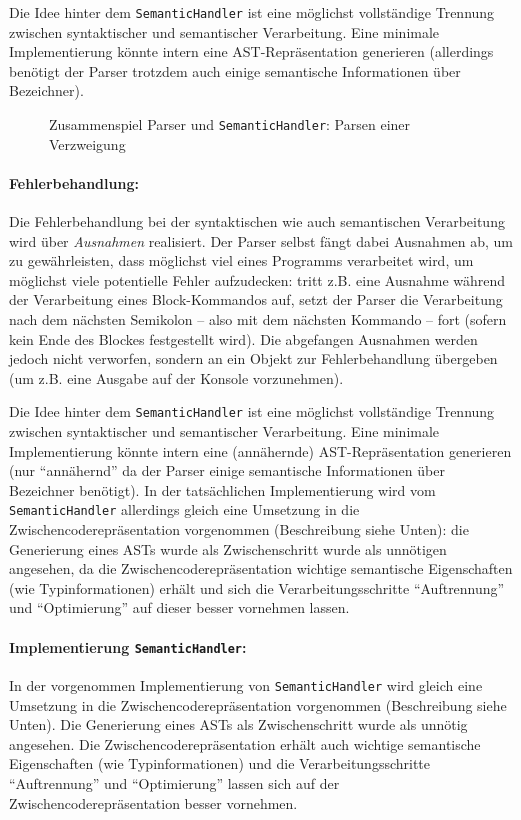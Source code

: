\documentclass[twoside,a4paper,fleqn,12pt]{article}
\begin{document}
Die Idee hinter dem \verb+SemanticHandler+ ist eine möglichst vollständige Trennung zwischen syntaktischer
und semantischer Verarbeitung. Eine minimale Implementierung könnte intern eine
AST-Repräsentation generieren (allerdings benötigt der Parser trotzdem auch einige semantische Informationen über
Bezeichner).

\begin{figure}[h]
   \centering
  
  \caption{Zusammenspiel Parser und \texttt{SemanticHandler}: Parsen einer Verzweigung}
  \label{fig:ParseIf}
\end{figure}

\paragraph{Fehlerbehandlung:}
Die Fehlerbehandlung bei der syntaktischen wie auch semantischen Verarbeitung wird über \emph{Ausnahmen}
realisiert. Der Parser selbst fängt dabei Ausnahmen ab, um zu gewährleisten, dass möglichst viel eines
Programms verarbeitet wird, um möglichst viele potentielle Fehler aufzudecken: %
tritt z.B. eine Ausnahme während der Verarbeitung eines Block-Kommandos auf, setzt der Parser die
Verarbeitung nach dem nächsten Semikolon -- also mit dem nächsten Kommando -- fort (sofern kein Ende
des Blockes festgestellt wird).
Die abgefangen Ausnahmen werden jedoch nicht verworfen, sondern an ein Objekt zur Fehlerbehandlung
übergeben (um z.B. eine Ausgabe auf der Konsole vorzunehmen).

Die Idee hinter dem \verb+SemanticHandler+ ist eine möglichst vollständige Trennung zwischen syntaktischer
und semantischer Verarbeitung. Eine minimale Implementierung könnte intern eine (annähernde)
AST-Repräsentation generieren (nur "`annähernd"' da der Parser einige semantische Informationen über
Bezeichner benötigt). In der tatsächlichen Implementierung wird vom \verb+SemanticHandler+ allerdings 
gleich eine Umsetzung in die Zwischencoderepräsentation vorgenommen (Beschreibung siehe Unten):
die Generierung eines ASTs wurde als Zwischenschritt wurde als unnötigen angesehen, da die Zwischencoderepräsentation
wichtige semantische Eigenschaften (wie Typinformationen) erhält und sich die Verarbeitungsschritte "`Auftrennung"'
und "`Optimierung"' auf dieser besser vornehmen lassen.

\paragraph{Implementierung \texttt{SemanticHandler}:}
In der vorgenommen Implementierung von \verb+SemanticHandler+ wird gleich eine Umsetzung in die Zwischencoderepräsentation vorgenommen
(Beschreibung siehe Unten). Die Generierung eines ASTs als Zwischenschritt wurde als unnötig angesehen.
Die Zwischencoderepräsentation erhält auch wichtige semantische Eigenschaften (wie Typinformationen) und
die Verarbeitungsschritte "`Auftrennung"' und "`Optimierung"' lassen sich auf der Zwischencoderepräsentation besser vornehmen.
\end{document}
